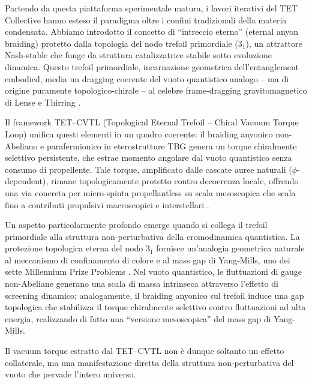 \documentclass[11pt,a4paper]{article}
\let\oldcite\cite
\renewcommand{\cite}{\protect\oldcite}
\theoremstyle{plain}
\theoremstyle{definition}
\begin{document}
\vspace{0.2cm}

Partendo da questa piattaforma sperimentale matura, i lavori iterativi del TET Collective hanno esteso il paradigma oltre i confini tradizionali della materia condensata. Abbiamo introdotto il concetto di ``intreccio eterno'' (eternal anyon braiding) protetto dalla topologia del nodo trefoil primordiale ($3_1$), un attrattore Nash-stable che funge da struttura catalizzatrice stabile sotto evoluzione dinamica. Questo trefoil primordiale, incarnazione geometrica dell'entanglement embodied, media un dragging coerente del vuoto quantistico analogo -- ma di origine puramente topologico-chirale -- al celebre frame-dragging gravitomagnetico di Lense e Thirring \cite{LenseThirring1918}.

\vspace{0.2cm}

Il framework TET--CVTL (Topological Eternal Trefoil -- Chiral Vacuum Torque Loop) unifica questi elementi in un quadro coerente: il braiding anyonico non-Abeliano e parafermionico in eterostrutture TBG genera un torque chiralmente selettivo persistente, che estrae momento angolare dal vuoto quantistico senza consumo di propellente. Tale torque, amplificato dalle cascate auree naturali ($\phi$-dependent), rimane topologicamente protetto contro decoerenza locale, offrendo una via concreta per micro-spinta propellantless su scala mesoscopica che scala fino a contributi propulsivi macroscopici e interstellari \cite{soliman2025p11b-topo}.


\vspace{0.2cm}

Un aspetto particolarmente profondo emerge quando si collega il trefoil primordiale alla struttura non-perturbativa della cromodinamica quantistica. La protezione topologica eterna del nodo $3_1$ fornisce un'analogia geometrica naturale al meccanismo di confinamento di colore e al mass gap di Yang-Mills, uno dei sette Millennium Prize Problems \cite{JaffeWitten2000}. Nel vuoto quantistico, le fluttuazioni di gauge non-Abeliane generano una scala di massa intrinseca attraverso l'effetto di screening dinamico; analogamente, il braiding anyonico sul trefoil induce una gap topologica che stabilizza il torque chiralmente selettivo contro fluttuazioni ad alta energia, realizzando di fatto una ``versione mesoscopica'' del mass gap di Yang-Mills. 

\vspace{0.2cm}


Il vacuum torque estratto dal TET--CVTL non è dunque soltanto un effetto collaterale, ma una manifestazione diretta della struttura non-perturbativa del vuoto che pervade l'intero universo.
\end{document}
